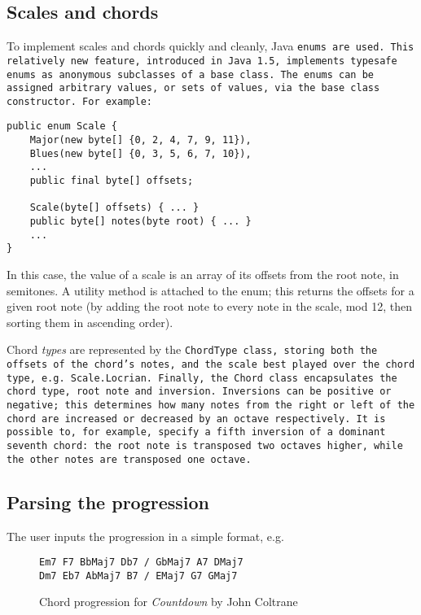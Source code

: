 \subsection{Scales and chords}

To implement scales and chords quickly and cleanly, Java \tt{enum}s are used. This relatively new feature, introduced in Java 1.5, implements typesafe enums as anonymous subclasses of a base class. The enums can be assigned arbitrary values, or sets of values, via the base class constructor. For example:

\begin{lstlisting}[style=snippet]
public enum Scale {
	Major(new byte[] {0, 2, 4, 7, 9, 11}),
	Blues(new byte[] {0, 3, 5, 6, 7, 10}),
	...
	public final byte[] offsets;
	
	Scale(byte[] offsets) { ... }
	public byte[] notes(byte root) { ... }
	...
}
\end{lstlisting}

In this case, the value of a scale is an array of its offsets from the root note, in semitones. A utility method is attached to the enum; this returns the offsets for a given root note (by adding the root note to every note in the scale, mod 12, then sorting them in ascending order).

Chord \emph{types} are represented by the \tt{ChordType} class, storing both the offsets of the chord's notes, and the scale best played over the chord type, e.g.\  \tt{Scale.Locrian}. Finally, the \tt{Chord} class encapsulates the chord type, root note and inversion. Inversions can be positive or negative; this determines how many notes from the right or left of the chord are increased or decreased by an octave respectively. It is possible to, for example, specify a fifth inversion of a dominant seventh chord: the root note is transposed two octaves higher, while the other notes are transposed one octave.

\subsection{Parsing the progression}

The user inputs the progression in a simple format, e.g.

\begin{figure}[H]
	\centering
	\tt{Em7 F7 BbMaj7 Db7 / GbMaj7 A7 DMaj7 \\ Dm7 Eb7 AbMaj7 B7 / EMaj7 G7 GMaj7}
	\label{fig-favourite-things}
	\caption{Chord progression for \emph{Countdown} by John Coltrane}
\end{figure}

